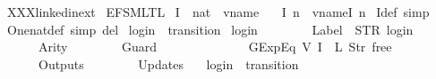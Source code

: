 %
\begin{isabellebody}%
%
%
\isadelimtheory
%
\endisadelimtheory
%
\isatagtheory
{}\isamarkupfalse%
\ XXXlinkedin{\isacharunderscore}ext\isanewline
{}\ {\isachardoublequoteopen}{\isachardot}{\isachardot}{\isacharslash}{\isachardot}{\isachardot}{\isacharslash}EFSM{\isacharunderscore}LTL{\isachardoublequoteclose}\isanewline
{}%
\endisatagtheory
{\isafoldtheory}%
%
\isadelimtheory
\isanewline
%
\endisadelimtheory
\isanewline
{}\isamarkupfalse%
\ I\ {\isacharcolon}{\isacharcolon}\ {\isachardoublequoteopen}nat\ {\isasymRightarrow}\ vname{\isachardoublequoteclose}\ \isanewline
\ \ {\isachardoublequoteopen}I\ n\ {\isacharequal}\ vname{\isachardot}I\ {\isacharparenleft}n{\isacharminus}{}{\isacharparenright}{\isachardoublequoteclose}\isanewline
{}\isamarkupfalse%
\ I{\isacharunderscore}def\ {\isacharbrackleft}simp{\isacharbrackright}\isanewline
\isanewline
{}\isamarkupfalse%
\ One{\isacharunderscore}nat{\isacharunderscore}def\ {\isacharbrackleft}simp\ del{\isacharbrackright}\isanewline
\isanewline
{}\isamarkupfalse%
\ {\isachardoublequoteopen}login{\isachardoublequoteclose}\ {\isacharcolon}{\isacharcolon}\ {\isachardoublequoteopen}transition{\isachardoublequoteclose}\ \isanewline
{\isachardoublequoteopen}login\ {\isasymequiv}\ {\isasymlparr}\isanewline
\ \ \ \ \ \ Label\ {\isacharequal}\ STR\ {\isacharprime}{\isacharprime}login{\isacharprime}{\isacharprime}{\isacharcomma}\isanewline
\ \ \ \ \ \ Arity\ {\isacharequal}\ {}{\isacharcomma}\isanewline
\ \ \ \ \ \ Guard\ {\isacharequal}\ {\isacharbrackleft}\isanewline
\ \ \ \ \ \ \ \ \ \ \ \ GExp{\isachardot}Eq\ {\isacharparenleft}V\ {\isacharparenleft}I\ {}{\isacharparenright}{\isacharparenright}\ {\isacharparenleft}L\ {\isacharparenleft}Str\ {\isacharprime}{\isacharprime}free{\isacharprime}{\isacharprime}{\isacharparenright}{\isacharparenright}\isanewline
\ \ \ \ \ \ {\isacharbrackright}{\isacharcomma}\isanewline
\ \ \ \ \ \ Outputs\ {\isacharequal}\ {\isacharbrackleft}{\isacharbrackright}{\isacharcomma}\isanewline
\ \ \ \ \ \ Updates\ {\isacharequal}\ {\isacharbrackleft}{\isacharbrackright}\isanewline
{\isasymrparr}{\isachardoublequoteclose}\isanewline
\isanewline
{}\isamarkupfalse%
\ {\isachardoublequoteopen}login{}{\isachardoublequoteclose}\ {\isacharcolon}{\isacharcolon}\ {\isachardoublequoteopen}transition{\isachardoublequoteclose}\ \isanewline

\end{isabellebody}
